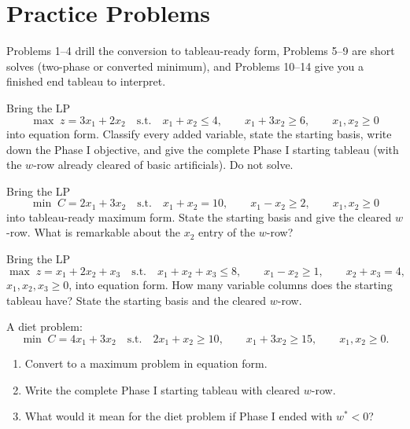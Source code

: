 \section{Practice Problems}

Problems 1--4 drill the conversion to tableau-ready form, Problems 5--9 are
short solves (two-phase or converted minimum), and Problems 10--14 give you
a finished end tableau to interpret.

\begin{problems}
  \item Bring the LP
        \[
          \max\; z=3x_{1}+2x_{2}
          \quad\text{s.t.}\quad
          x_{1}+x_{2}\le 4,\qquad
          x_{1}+3x_{2}\ge 6,\qquad
          x_{1},x_{2}\ge 0
        \]
        into equation form. Classify every added variable, state the
        starting basis, write down the Phase I objective, and give the
        complete Phase I starting tableau (with the $w$-row already cleared
        of basic artificials). Do not solve.

  \item Bring the LP
        \[
          \min\; C=2x_{1}+3x_{2}
          \quad\text{s.t.}\quad
          x_{1}+x_{2}=10,\qquad
          x_{1}-x_{2}\ge 2,\qquad
          x_{1},x_{2}\ge 0
        \]
        into tableau-ready maximum form. State the starting basis and give
        the cleared $w$-row. What is remarkable about the $x_{2}$ entry of
        the $w$-row?

  \item Bring the LP
        \[
          \max\; z=x_{1}+2x_{2}+x_{3}
          \quad\text{s.t.}\quad
          x_{1}+x_{2}+x_{3}\le 8,\qquad
          x_{1}-x_{2}\ge 1,\qquad
          x_{2}+x_{3}=4,
        \]
        $x_{1},x_{2},x_{3}\ge 0$, into equation form. How many variable
        columns does the starting tableau have? State the starting basis and
        the cleared $w$-row.

  \item A diet problem:
        \[
          \min\; C=4x_{1}+3x_{2}
          \quad\text{s.t.}\quad
          2x_{1}+x_{2}\ge 10,\qquad
          x_{1}+3x_{2}\ge 15,\qquad
          x_{1},x_{2}\ge 0 .
        \]
        \begin{enumerate}[label=(\alph*),leftmargin=2.2em,itemsep=0.2ex]
          \item Convert to a maximum problem in equation form.
          \item Write the complete Phase I starting tableau with cleared
                $w$-row.
          \item What would it mean for the diet problem if Phase I ended
                with $w^{*}<0$?
        \end{enumerate}


\end{problems}
